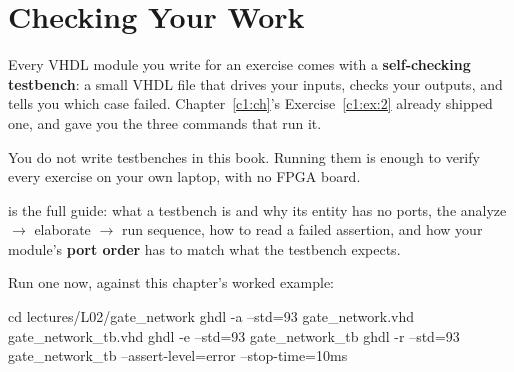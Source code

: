 \section{Checking Your Work}
\label{c2:a7}
Every VHDL module you write for an exercise comes with a \textbf{self-checking testbench}: a small
VHDL file that drives your inputs, checks your outputs, and tells you which case failed.
Chapter~\ref{c1:ch}'s Exercise~\ref{c1:ex:2} already shipped one, and  gave you the
three commands that run it.

You do not write testbenches in this book. Running them is enough to verify every exercise on your
own laptop, with no FPGA board.

 is the full guide: what a testbench is and why its entity has no ports, the
analyze $\to$ elaborate $\to$ run sequence, how to read a failed assertion, and how your module's
\textbf{port order} has to match what the testbench expects.

Run one now, against this chapter's worked example:

\begin{shell}
cd lectures/L02/gate_network
ghdl -a --std=93 gate_network.vhd gate_network_tb.vhd
ghdl -e --std=93 gate_network_tb
ghdl -r --std=93 gate_network_tb --assert-level=error --stop-time=10ms
\end{shell}
